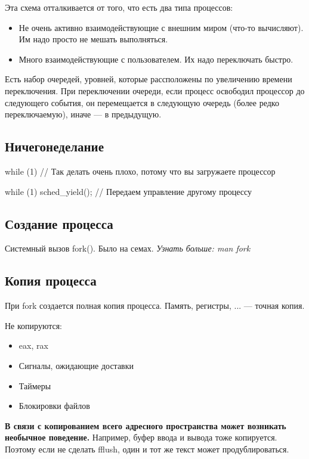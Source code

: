 Эта схема отталкивается от того, что есть два типа процессов:
\begin{itemize}
	\item Не очень активно взаимодействующие с внешним миром (что-то вычисляют). 
	Им надо просто не мешать выполняться. 
	\item Много взаимодействующие с пользователем. Их надо переключать быстро.
\end{itemize}

Есть набор очередей, уровней, которые рассположены по увеличению времени переключения.
При переключении очереди, если процесс освободил процессор до следующего события, он
перемещается в следующую очередь (более редко переключаемую), иначе --- в предыдущую.

\subsection{Ничегонеделание}

while (1) {
	// Так делать очень плохо, потому что вы загружаете процессор
}

while (1) {
	sched\_yield(); // Передаем управление другому процессу
}

\subsection{Создание процесса}

Системный вызов fork().
Было на семах. 
\textit{Узнать больше: man fork}

\subsection{Копия процесса}

При fork создается полная копия процесса. Память, регистры, ... --- точная копия.

Не копируются:
\begin{itemize}
	\item eax, rax
	\item Сигналы, ожидающие доставки
	\item Таймеры
	\item Блокировки файлов
\end{itemize}

\textbf{В связи с копированием всего адресного пространства может возникать необычное поведение.} Например, 
буфер ввода и вывода тоже копируется. Поэтому если не сделать fflush, один и тот
же текст может продублироваться.

